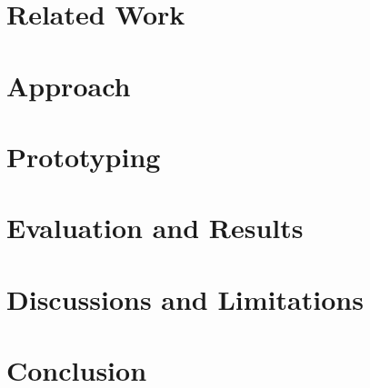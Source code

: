 \documentclass[manuscript,screen,review, nonacm=true]{acmart}
\begin{document}
\section{Related Work} \label{sec:rel_work}


\section{Approach} \label{sec:approach}


\section{Prototyping} \label{sec:prototyping}


\section{Evaluation and Results} \label{sec:evaluation}


\section{Discussions and Limitations} \label{sec:discussions}




\section{Conclusion} \label{sec:conclusion}





\end{document}
